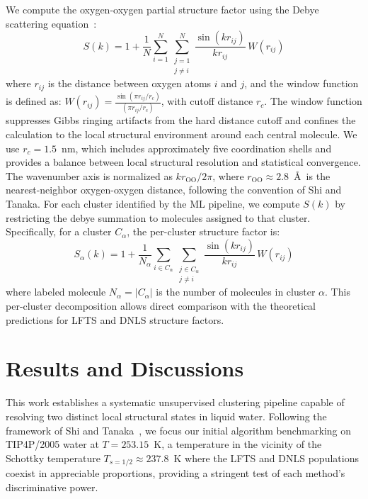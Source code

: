 \documentclass[aps, amsmath,amssymb, reprint, onecolumn,notitlepage,superscriptaddress]{revtex4-2}
\begin{document}
We compute the oxygen-oxygen partial structure factor using the Debye scattering equation~\cite{debye_zerstreuung_1915}:
\begin{equation}
S(k) = 1 + \frac{1}{N}\sum_{i=1}^{N}\sum_{\substack{j=1 \\ j\neq i}}^{N}\frac{\sin(k r_{ij})}{k r_{ij}}\,W(r_{ij})
\label{eq:debye}
\end{equation}
where $r_{ij}$ is the distance between oxygen atoms $i$ and $j$, and the window function is defined as: $W(r_{ij}) = \frac{\sin(\pi r_{ij}/r_c)}{(\pi r_{ij}/r_c)}$, with cutoff distance $r_c$. The window function suppresses Gibbs ringing artifacts from the hard distance cutoff and confines the calculation to the local structural environment around each central molecule. We use $r_c = 1.5$~nm, which includes approximately five coordination shells and provides a balance between local structural resolution and statistical convergence. The wavenumber axis is normalized as $k r_{\text{OO}}/2\pi$, where $r_{\text{OO}} \approx 2.8$~\AA\ is the nearest-neighbor oxygen-oxygen distance, following the convention of Shi and Tanaka. For each cluster identified by the ML pipeline, we compute $S(k)$ by restricting the debye summation to molecules assigned to that cluster. Specifically, for a cluster $C_\alpha$, the per-cluster structure factor is:
\begin{equation}
S_\alpha(k) = 1 + \frac{1}{N_\alpha}\sum_{i \in C_\alpha}\sum_{\substack{j \in C_\alpha \\ j\neq i}}\frac{\sin(k r_{ij})}{k r_{ij}}\,W(r_{ij})
\end{equation}
where labeled molecule $N_\alpha = |C_\alpha|$ is the number of molecules in cluster $\alpha$. This per-cluster decomposition allows direct comparison with the theoretical predictions for LFTS and DNLS structure factors.

\section{Results and Discussions}
This work establishes a systematic unsupervised clustering pipeline capable of resolving two distinct local structural states in liquid water. Following the framework of Shi and Tanaka~\cite{shi_direct_2020}, we focus our initial algorithm benchmarking on TIP4P/2005 water at $T = 253.15$~K, a temperature in the vicinity of the Schottky temperature $T_{s=1/2} \approx 237.8$~K where the LFTS and DNLS populations coexist in appreciable proportions, providing a stringent test of each method's discriminative power.
\end{document}
